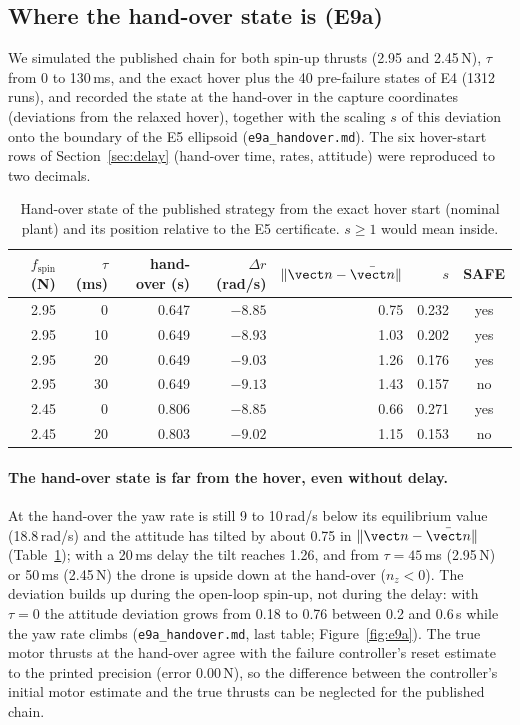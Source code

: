\subsection{Where the hand-over state is (E9a)}
We simulated the published chain for both spin-up thrusts (2.95 and 2.45\,N), $\tau$ from 0 to 130\,ms, and the exact hover plus the 40 pre-failure states of E4 (1312 runs), and recorded the state at the hand-over in the capture coordinates (deviations from the relaxed hover), together with the scaling $s$ of this deviation onto the boundary of the E5 ellipsoid (\texttt{e9a\_handover.md}). The six hover-start rows of Section~\ref{sec:delay} (hand-over time, rates, attitude) were reproduced to two decimals.

\begin{table}[h]
\centering\small
\caption{Hand-over state of the published strategy from the exact hover start (nominal plant) and its position relative to the E5 certificate. $s\ge1$ would mean inside.}\label{tab:e9a}
\begin{tabular}{rrrrrrc}
\toprule
$f_{\text{spin}}$ (N) & $\tau$ (ms) & hand-over (s) & $\Delta r$ (rad/s) & $\|\vect n-\bar{\vect n}\|$ & $s$ & SAFE \\
\midrule
2.95 & 0  & 0.647 & $-8.85$ & 0.75 & 0.232 & yes \\
2.95 & 10 & 0.649 & $-8.93$ & 1.03 & 0.202 & yes \\
2.95 & 20 & 0.649 & $-9.03$ & 1.26 & 0.176 & yes \\
2.95 & 30 & 0.649 & $-9.13$ & 1.43 & 0.157 & no \\
2.45 & 0  & 0.806 & $-8.85$ & 0.66 & 0.271 & yes \\
2.45 & 20 & 0.803 & $-9.02$ & 1.15 & 0.153 & no \\
\bottomrule
\end{tabular}
\end{table}

\paragraph{The hand-over state is far from the hover, even without delay.} At the hand-over the yaw rate is still 9 to 10\,rad/s below its equilibrium value (18.8\,rad/s) and the attitude has tilted by about 0.75 in $\|\vect n-\bar{\vect n}\|$ (Table~\ref{tab:e9a}); with a 20\,ms delay the tilt reaches 1.26, and from $\tau = 45$\,ms (2.95\,N) or 50\,ms (2.45\,N) the drone is upside down at the hand-over ($n_z<0$). The deviation builds up during the open-loop spin-up, not during the delay: with $\tau=0$ the attitude deviation grows from 0.18 to 0.76 between 0.2 and 0.6\,s while the yaw rate climbs (\texttt{e9a\_handover.md}, last table; Figure~\ref{fig:e9a}). The true motor thrusts at the hand-over agree with the failure controller's reset estimate to the printed precision (error 0.00\,N), so the difference between the controller's initial motor estimate and the true thrusts can be neglected for the published chain.

